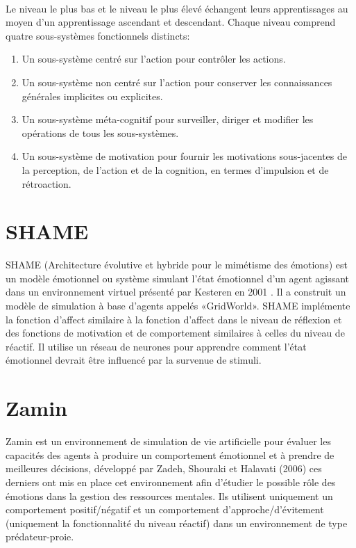 ~\par
Le niveau le plus bas et le niveau le plus élevé échangent leurs apprentissages au moyen d'un apprentissage ascendant et descendant. Chaque niveau comprend quatre sous-systèmes fonctionnels distincts:

\begin{enumerate}
\item Un sous-système centré sur l'action pour contrôler les actions.
\item Un sous-système non centré sur l'action pour conserver les connaissances générales implicites ou explicites.
\item Un sous-système méta-cognitif pour surveiller, diriger et modifier les opérations de tous les sous-systèmes.
\item Un sous-système de motivation pour fournir les motivations sous-jacentes de la perception, de l'action et de la cognition, en termes d'impulsion et de rétroaction.
\end{enumerate}

\section{SHAME}

SHAME (Architecture évolutive et hybride pour le mimétisme des émotions) est un modèle émotionnel ou système simulant l'état émotionnel d'un agent agissant dans un environnement virtuel présenté par Kesteren en 2001 \parencite{kesteren2001supervised}. Il a construit un modèle de simulation à base d'agents appelés «GridWorld». SHAME implémente la fonction d’affect similaire à la fonction d’affect dans le niveau de réflexion et des fonctions de motivation et de comportement similaires à celles du niveau de réactif. Il utilise un réseau de neurones pour apprendre comment l'état émotionnel devrait être influencé par la survenue de stimuli.


\section{Zamin}

Zamin est un environnement de simulation de vie artificielle pour évaluer les capacités des agents à produire un comportement émotionnel et à prendre de meilleures décisions, développé par Zadeh, Shouraki et Halavati (2006) \parencite{zadeh2006emotional} ces derniers ont mis en place cet environnement afin d’étudier le possible rôle des émotions dans la gestion des ressources mentales. Ils utilisent uniquement un comportement positif/négatif et un comportement d'approche/d'évitement (uniquement la fonctionnalité du niveau réactif) dans un environnement de type prédateur-proie.

